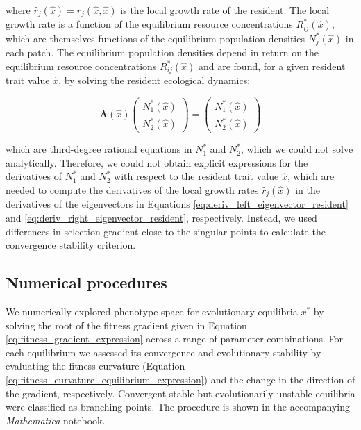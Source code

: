 where $\hat r_j(\hat x) = r_j(\hat x, \hat x)$ is the local growth rate of the resident. The local growth rate is a function of the equilibrium resource concentrations $R^*_{ij}(\hat x)$, which are themselves functions of the equilibrium population densities $N^*_j(\hat x)$ in each patch. The equilibrium population densities depend in return on the equilibrium resource concentrations $R^*_{ij}(\hat x)$ and are found, for a given resident trait value $\hat x$, by solving the resident ecological dynamics:

\begin{equation}
    \pmb \Lambda(\hat x)
    \begin{pmatrix}
        N^*_1(\hat x)\\
        N^*_2(\hat x)
    \end{pmatrix}
    =
    \begin{pmatrix}
        N^*_1(\hat x)\\
        N^*_2(\hat x) 
    \end{pmatrix}
\end{equation}

which are third-degree rational equations in $N^*_1$ and $N^*_2$, which we could not solve analytically. Therefore, we could not obtain explicit expressions for the derivatives of $N^*_1$ and $N^*_2$ with respect to the resident trait value $\hat x$, which are needed to compute the derivatives of the local growth rates $\hat r_j(\hat x)$ in the derivatives of the eigenvectors in Equations \ref{eq:deriv_left_eigenvector_resident} and \ref{eq:deriv_right_eigenvector_resident}, respectively. Instead, we used differences in selection gradient close to the singular points to calculate the convergence stability criterion.

\subsection*{Numerical procedures}

We numerically explored phenotype space for evolutionary equilibria $x^*$ by solving the root of the fitness gradient given in Equation \ref{eq:fitness_gradient_expression} across a range of parameter combinations. For each equilibrium we assessed its convergence and evolutionary stability by evaluating the fitness curvature (Equation \ref{eq:fitness_curvature_equilibrium_expression}) and the change in the direction of the gradient, respectively. Convergent stable but evolutionarily unstable equilibria were classified as branching points. The procedure is shown in the accompanying \textit{Mathematica} notebook.